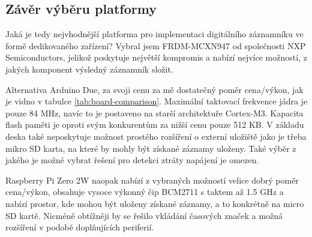\subsection{Závěr výběru platformy}
Jaká je tedy nejvhodnější platforma pro implementaci digitálního záznamníku ve formě dedikovaného zařízení? Vybral jsem FRDM-MCXN947 od společnosti NXP Semiconductors, jelikož poskytuje největší kompromis a nabízí nejvíce možností, z jakých komponent výsledný záznamník složit.

Alternativa Arduino Due, za svoji cenu za mě dostatečný poměr cena/výkon, jak je vidno v tabulce \ref{tab:board-comparison}. Maximální taktovací frekvence jádra je pouze 84 MHz, navíc to je postaveno na starší architektuře Cortex-M3. Kapacita flash paměti je oproti svým konkurentům za nižší cenu pouze 512 KB. V základu deska také neposkytuje možnost prostého rozšíření o externí uložiště jako je třeba mikro SD karta, na které by mohly být získané záznamy uloženy. Také výběr z jakého je možné vybrat řešení pro detekci ztráty napájení je omezen.

Raspberry Pi Zero 2W naopak nabízí z vybraných možností velice dobrý poměr cena/výkon, obsahuje vysoce výkonný čip BCM2711 s taktem až 1.5 GHz a nabízí prostor, kde mohou být uloženy získané záznamy, a to konkrétně na micro SD kartě. Nicméně obtížněji by se řešilo vkládání časových značek a možná rozšíření v podobě doplňujících periferií.

